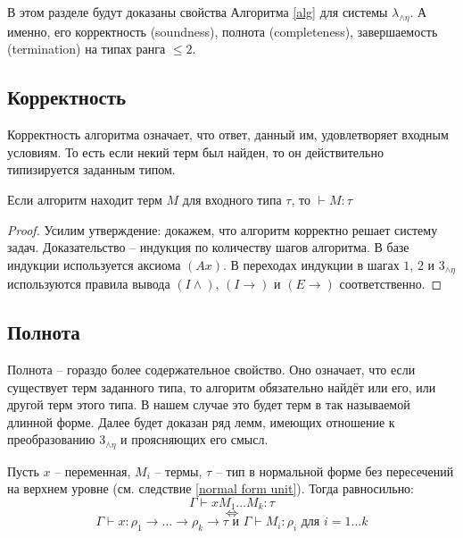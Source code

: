 \documentclass[../main.tex]{subfiles}
\begin{document}
 \label{sec:properties}



В этом разделе будут доказаны свойства Алгоритма \ref{alg} для системы $\lambda_{\wedge \eta}$. А именно, его корректность (soundness), полнота (completeness), завершаемость (termination) на типах ранга $\leqslant 2$.


\subsection{Корректность}

Корректность алгоритма означает, что ответ, данный им, удовлетворяет входным условиям. То есть если некий терм был найден, то он действительно типизируется заданным типом.

\begin{theorem}[Soundness] \label{soundness}
Если алгоритм находит терм $M$ для входного типа $\tau$, то $\vdash M \colon \tau$
\end{theorem}
\begin{proof}
Усилим утверждение: докажем, что алгоритм корректно решает систему задач. Доказательство -- индукция по количеству шагов алгоритма. В базе индукции используется аксиома $(Ax)$. В переходах индукции в шагах $1$, $2$ и $3_{\wedge \eta}$ используются правила вывода $(I \wedge)$, $(I \to)$ и $(E \to)$ соответственно.
\end{proof}

\subsection{Полнота}

Полнота -- гораздо более содержательное свойство. Оно означает, что если существует терм заданного типа, то алгоритм обязательно найдёт или его, или другой терм этого типа. В нашем случае это будет терм в так называемой длинной форме.
Далее будет доказан ряд лемм, имеющих отношение к преобразованию $3_{\wedge \eta}$ и проясняющих его смысл. 

\begin{lemma} \label{необходимая типизация}

Пусть $x$ -- переменная, $M_i$ -- термы, $\tau$ -- тип в нормальной форме без пересечений на верхнем уровне (см. следствие \ref{normal form unit}). Тогда равносильно: 
    $$\Gamma \vdash x M_1 \dots M_k \colon \tau$$ 
    $$\iff$$
    $$\Gamma \vdash x \colon \rho_1 \to \dots \to \rho_k \to \tau \text{ и } \Gamma \vdash M_i \colon \rho_i \text{ для } i = 1 \dots k$$
\end{lemma}
\end{document}

